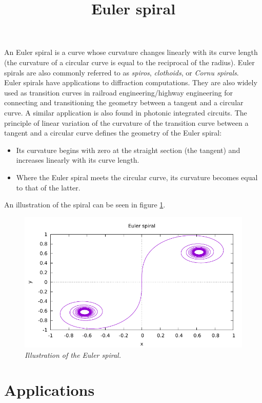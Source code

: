 \documentclass[a4paper, 10pt]{article}
\title{Euler spiral}
\begin{document}
\maketitle
An Euler spiral is a curve whose curvature changes linearly with its curve length (the curvature of a circular curve is equal to the reciprocal of the radius). Euler spirals are also commonly referred to as \textit{spiros}, \textit{clothoids}, or \textit{Cornu spirals}. \\

Euler spirals have applications to diffraction computations. They are also widely used as transition curves in railroad engineering/highway engineering for connecting and transitioning the geometry between a tangent and a circular curve. A similar application is also found in photonic integrated circuits. The principle of linear variation of the curvature of the transition curve between a tangent and a circular curve defines the geometry of the Euler spiral: 
\begin{itemize}
		\item Its curvature begins with zero at the straight section (the tangent) and increases linearly with its curve length.
		\item Where the Euler spiral meets the circular curve, its curvature becomes equal to that of the latter.
\end{itemize}
An illustration of the spiral can be seen in figure \ref{fig: spiral}.

\begin{figure}
	\centering
	\includegraphics[width=\linewidth]{spiral.pdf}
	\caption{\sl Illustration of the Euler spiral.}
	\label{fig: spiral}
\end{figure}

\section{Applications}
\end{document}
